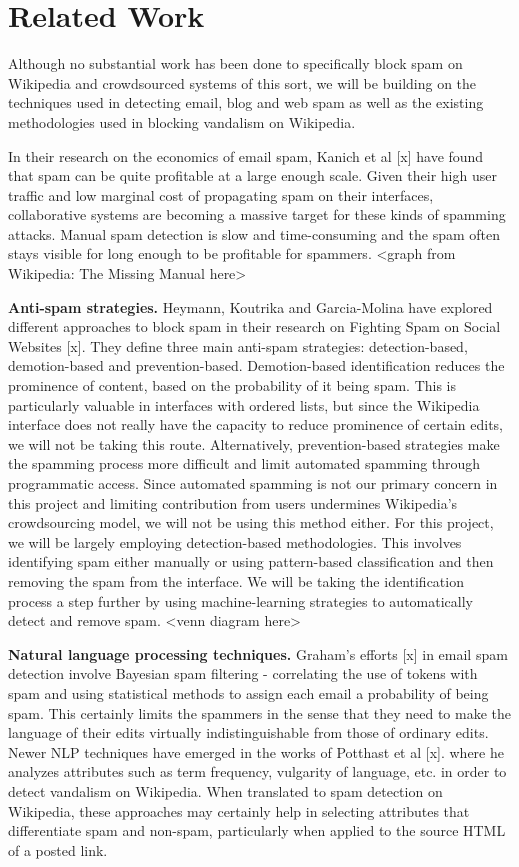 \documentclass[letterpaper]{sig-alternate}
\begin{document}
\section{Related Work}
\label{sec:related_work}
Although no substantial work has been done to specifically block spam on Wikipedia and crowdsourced systems of this sort, we will be building on the techniques used in detecting email, blog and web spam as well as the existing methodologies used in blocking vandalism on Wikipedia. 

In their research on the economics of email spam, Kanich et al [x] have found that spam can be quite profitable at a large enough scale. Given their high user traffic and low marginal cost of propagating spam on their interfaces, collaborative systems are becoming a massive target for these kinds of spamming attacks. Manual spam detection is slow and time-consuming and the spam often stays visible for long enough to be profitable for spammers.
<graph from Wikipedia: The Missing Manual here>

\textbf{Anti-spam strategies.} Heymann, Koutrika and Garcia-Molina have explored different approaches to block spam in their research on Fighting Spam on Social Websites [x]. They define three main anti-spam strategies: detection-based, demotion-based and prevention-based. Demotion-based identification reduces the prominence of content, based on the probability of it being spam. This is particularly valuable in interfaces with ordered lists, but since the Wikipedia interface does not really have the capacity to reduce prominence of certain edits, we will not be taking this route. Alternatively, prevention-based strategies make the spamming process more difficult and limit automated spamming through programmatic access. Since automated spamming is not our primary concern in this project and limiting contribution from users undermines Wikipedia’s crowdsourcing model, we will not be using this method either. For this project, we will be largely employing detection-based methodologies. This involves identifying spam either manually or using pattern-based classification and then removing the spam from the interface. We will be taking the identification process a step further by using machine-learning strategies to automatically detect and remove spam. <venn diagram here>

\textbf{Natural language processing techniques.} Graham’s efforts [x] in email spam detection involve Bayesian spam filtering - correlating the use of tokens with spam and using statistical methods to assign each email a probability of being spam. This certainly limits the spammers in the sense that they need to make the language of their edits virtually indistinguishable from those of ordinary edits. Newer NLP techniques have emerged in the works of Potthast et al [x]. where he analyzes attributes such as term frequency, vulgarity of language, etc. in order to detect vandalism on Wikipedia. When translated to spam detection on Wikipedia, these approaches may certainly help in selecting attributes that differentiate spam and non-spam, particularly when applied to the source HTML of a posted link.
\end{document}

